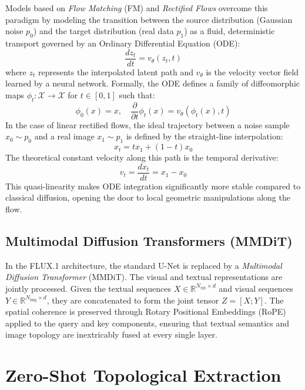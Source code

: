 \documentclass[12pt,a4paper]{report}
\begin{document}
Models based on \textit{Flow Matching} (FM) and \textit{Rectified Flows} overcome this paradigm by modeling the transition between the source distribution (Gaussian noise $p_0$) and the target distribution (real data $p_1$) as a fluid, deterministic transport governed by an Ordinary Differential Equation (ODE):
\begin{equation}
    \frac{dz_t}{dt} = v_\theta(z_t, t)
\end{equation}
where $z_t$ represents the interpolated latent path and $v_\theta$ is the velocity vector field learned by a neural network. Formally, the ODE defines a family of diffeomorphic maps $\phi_t: \mathcal{X} \to \mathcal{X}$ for $t \in [0, 1]$ such that:
\begin{equation}
    \phi_0(x) = x, \quad \frac{\partial}{\partial t}\phi_t(x) = v_\theta(\phi_t(x), t)
\end{equation}
In the case of linear rectified flows, the ideal trajectory between a noise sample $x_0 \sim p_0$ and a real image $x_1 \sim p_1$ is defined by the straight-line interpolation:
\begin{equation}
    x_t = t x_1 + (1 - t) x_0
\end{equation}
The theoretical constant velocity along this path is the temporal derivative:
\begin{equation}
    v_t = \frac{dx_t}{dt} = x_1 - x_0
\end{equation}
This quasi-linearity makes ODE integration significantly more stable compared to classical diffusion, opening the door to local geometric manipulations along the flow.

\section{Multimodal Diffusion Transformers (MMDiT)}
In the FLUX.1 architecture, the standard U-Net is replaced by a \textit{Multimodal Diffusion Transformer} (MMDiT). The visual and textual representations are jointly processed. Given the textual sequences $X \in \mathbb{R}^{N_{\text{txt}} \times d}$ and visual sequences $Y \in \mathbb{R}^{N_{\text{img}} \times d}$, they are concatenated to form the joint tensor $Z = [X; Y]$. 
The spatial coherence is preserved through Rotary Positional Embeddings (RoPE) applied to the query and key components, ensuring that textual semantics and image topology are inextricably fused at every single layer.

\chapter{Zero-Shot Topological Extraction}
\end{document}
